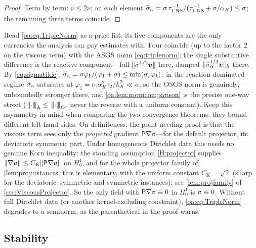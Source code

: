 \begin{proof}
Term by term: $\nu \le 2\nu$; on each element
$\widetilde{\sigma}_\alpha = \sigma\,\tau_{1,\mathrm{NS}}^{-1}/(\tau_{1,\mathrm{NS}}^{-1}+\sigma/\alpha_K) \le \sigma$;
the remaining three terms coincide.
\end{proof}

\begin{pedagogy}
Read \cref{oa:eq:TripleNorm} as a price list: its five components are the only
currencies the analysis can pay estimates with. Four coincide (up to the factor
$2$ on the viscous term) with the ASGS norm \cref{eq:triplenorm}; the single
substantive difference is the reactive component---full $\lVert \sigma^{1/2}\boldsymbol{v} \rVert$
here, damped $\lVert\widetilde{\sigma}_{\alpha}^{1/2}\boldsymbol{v}\rVert_h$ there. By
\cref{eq:sigmatilde}, $\widetilde{\sigma}_{\alpha} = \sigma\varphi_1/(\varphi_1+\sigma) \le
\min(\sigma, \varphi_1)$: in the reaction-dominated regime $\widetilde{\sigma}_{\alpha}$
saturates at $\varphi_1 = c_1\alpha_K^2\tau_2/h_K^2 \ll \sigma$, so the OSGS
norm is genuinely, unboundedly stronger there, and \cref{oa:lem:normcomparison}
is the precise one-way street (${\lvert\kern-0.25ex\lvert\kern-0.25ex\lvert \cdot \rvert\kern-0.25ex\rvert\kern-0.25ex\rvert}_{\mathrm A} \le
{\lvert\kern-0.25ex\lvert\kern-0.25ex\lvert \cdot \rvert\kern-0.25ex\rvert\kern-0.25ex\rvert}_{\mathrm O}$, never the reverse with a uniform constant). Keep
this asymmetry in mind when comparing the two convergence theorems: they bound
different left-hand sides. On definiteness: the point needing proof is that the
viscous term sees only the \emph{projected} gradient $\mathsf{P}\nabla\boldsymbol{v}$---for the
default projector, its deviatoric symmetric part. Under homogeneous
Dirichlet data this needs no genuine Korn inequality: the standing assumption
\cref{H:projector} supplies $\lVert\nabla\boldsymbol{v}\rVert \le
C_{\mathrm{K}}\lVert\mathsf{P}\nabla\boldsymbol{v}\rVert$ on $H^1_0$, and for the whole projector family of
\cref{lem:projinstances} this is elementary, with the uniform constant
$C_{\mathrm{K}} = \sqrt2$ (sharp for the deviatoric--symmetric and symmetric instances);
see \cref{lem:projfamily} of \cref{sec:ViscousProjector}. So the only field
with $\mathsf{P}\nabla\boldsymbol{v}\equiv0$ in $H^1_0$ is $\boldsymbol{v}\equiv0$. Without full Dirichlet data (or
another kernel-excluding constraint), \cref{oa:eq:TripleNorm} degrades to a
seminorm, as the parenthetical in the proof warns.
\end{pedagogy}

\subsection{Stability}
\label{oa:sec:stability}

